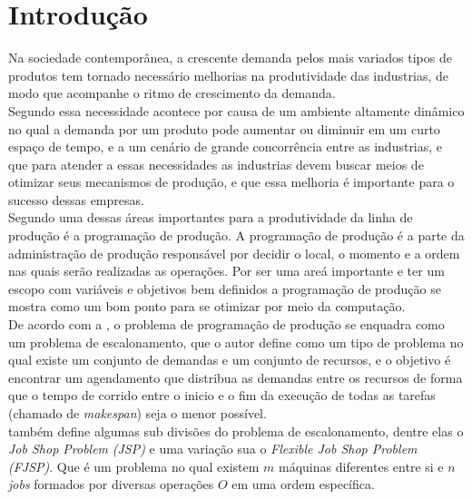 \chapter{Introdução}

Na sociedade contemporânea, a crescente demanda pelos mais variados tipos de produtos tem tornado necessário melhorias na produtividade das industrias, de modo que acompanhe o ritmo de crescimento da demanda.\\
\indent Segundo \citeauthor{Wari2016} essa necessidade acontece por causa de um ambiente altamente dinâmico no qual a demanda por um produto pode aumentar ou diminuir em um curto espaço de tempo, e a um cenário de grande concorrência entre as industrias, e que para atender a essas necessidades as industrias devem buscar meios de otimizar seus mecanismos de produção, e que essa melhoria é importante para o sucesso dessas empresas.\\
\indent Segundo \citeauthor{Xhafa2008} uma dessas áreas importantes para a produtividade da linha de produção é a programação de produção. 
A programação de produção é a parte da administração de produção responsável por decidir o local, o momento e a ordem nas quais serão realizadas as operações. 
Por ser uma areá importante e ter um escopo com variáveis e objetivos bem definidos a programação de produção se mostra como um bom ponto para se otimizar por meio da computação.\\
\indent De acordo com a \citeauthor{Bagchi1999}, o problema de programação de produção se enquadra como um problema de escalonamento, que o autor define como um tipo de problema no qual existe um conjunto de demandas e um conjunto de recursos, e o objetivo é encontrar um agendamento que distribua as demandas entre os recursos de forma que o tempo de corrido entre o inicio e o fim da execução de todas as tarefas (chamado de \textit{makespan}) seja o menor possível.\\
\indent \citeauthor{Bagchi1999} também define algumas sub divisões do problema de escalonamento, dentre elas o \textit{Job Shop Problem} \textit{(JSP)} e uma variação sua o \textit{Flexible Job Shop Problem} \textit{(FJSP)}. 
Que é um problema no qual existem $m$ máquinas diferentes entre si e $n$ \textit{jobs} formados por diversas operações $O$ em uma ordem específica.\\
